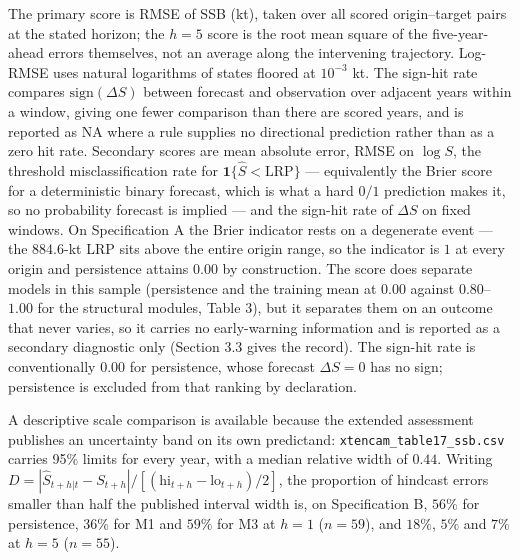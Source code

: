 \documentclass[11pt]{article}
\begin{document}
The primary score is RMSE of SSB (kt), taken over all scored
origin--target pairs at the stated horizon; the \(h=5\) score is the
root mean square of the five-year-ahead errors themselves, not an
average along the intervening trajectory. Log-RMSE uses natural
logarithms of states floored at \(10^{-3}\) kt. The sign-hit rate
compares \(\mathrm{sign}(\Delta S)\) between forecast and observation
over adjacent years within a window, giving one fewer comparison than
there are scored years, and is reported as NA where a rule supplies no
directional prediction rather than as a zero hit rate. Secondary scores are mean
absolute error, RMSE on \(\log S\), the threshold misclassification
rate for \(\mathbf{1}\{\hat S<\mathrm{LRP}\}\) --- equivalently the
Brier score for a deterministic binary forecast, which is what a hard
\(0/1\) prediction makes it, so no probability forecast is implied ---
and the sign-hit rate of \(\Delta S\) on fixed windows. On Specification A the Brier indicator
rests on a degenerate event --- the \(884.6\)-kt LRP sits above the
entire origin range, so the indicator is \(1\) at every origin and
persistence attains \(0.00\) by construction. The score does separate
models in this sample (persistence and the training mean at \(0.00\)
against \(0.80\)--\(1.00\) for the structural modules, Table 3), but it
separates them on an outcome that never varies, so it carries no
early-warning information and is reported as a secondary diagnostic only
(Section 3.3 gives the record). The
sign-hit rate is conventionally \(0.00\) for persistence, whose forecast
\(\Delta S = 0\) has no sign; persistence is excluded from that ranking
by declaration.

A descriptive scale comparison is available because the extended
assessment publishes an uncertainty band on its own predictand:
\texttt{xtencam\_table17\_ssb.csv} carries 95\% limits for every year,
with a median relative width of \(0.44\). Writing
\(D = |\hat S_{t+h|t} - S_{t+h}| / [(\mathrm{hi}_{t+h} -
\mathrm{lo}_{t+h})/2]\), the proportion of hindcast errors smaller than
half the published interval width is, on Specification B, \(56\%\) for
persistence, \(36\%\) for M1 and \(59\%\) for M3 at \(h=1\)
(\(n=59\)), and \(18\%\), \(5\%\) and \(7\%\) at \(h=5\) (\(n=55\)).
\end{document}
